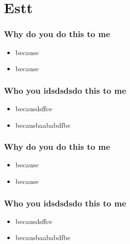 \documentclass{beamer}
\begin{document}
    \section{Estt}
        \begin{frame}
            \frametitle{Why do you do this to me}
            \begin{itemize}
                \item because
                \item because
            \end{itemize}
        \end{frame}
        \begin{frame}
            \frametitle{Who you idsdsdsdo this to me}
            \begin{itemize}
                \item becausdsffce
                \item becausbaababdfbe
            \end{itemize}
        \end{frame}
        \begin{frame}
            \frametitle{Why do you do this to me}
            \begin{itemize}
                \item because
                \item because
            \end{itemize}
        \end{frame}
        \begin{frame}
            \frametitle{Who you idsdsdsdo this to me}
            \begin{itemize}
                \item becausdsffce
                \item becausbaababdfbe
            \end{itemize}
        \end{frame}
\end{document}
